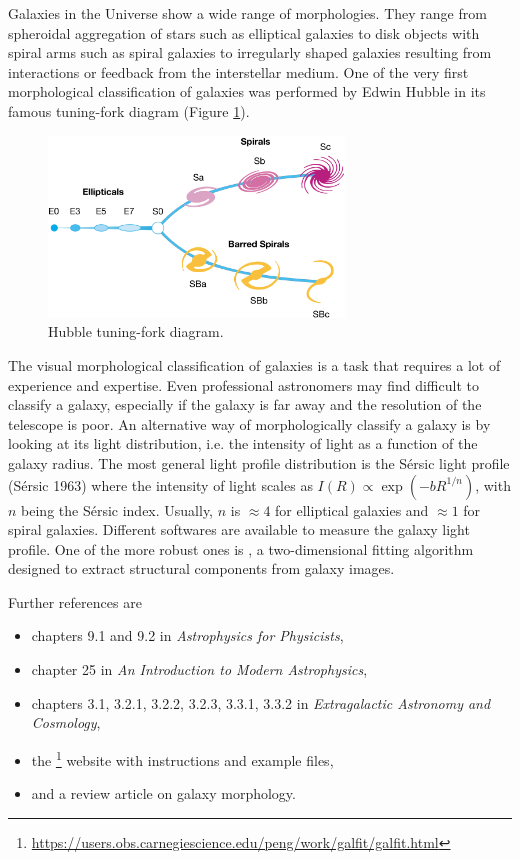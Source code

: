 \documentclass[a4paper, 11pt, fleqn]{memoir}
\begin{document}
Galaxies in the Universe show a wide range of morphologies.
They range from spheroidal aggregation of stars such as elliptical galaxies to disk objects with spiral arms such as spiral galaxies to irregularly shaped galaxies resulting from interactions or feedback from the interstellar medium.
One of the very first morphological classification of galaxies was performed by Edwin Hubble in its famous tuning-fork diagram (Figure \ref{fig:tuningfork}).

\begin{figure}
    \centering
    \includegraphics[width=0.7\textwidth]{tuningfork}
    \caption{Hubble tuning-fork diagram.}
    \label{fig:tuningfork}
\end{figure}

The visual morphological classification of galaxies is a task that requires a lot of experience and expertise.
Even professional astronomers may find difficult to classify a galaxy, especially if the galaxy is far away and the resolution of the telescope is poor.
An alternative way of morphologically classify a galaxy is by looking at its light distribution, i.e. the intensity of light as a function of the galaxy radius.
The most general light profile distribution is the Sérsic light profile (Sérsic 1963) where the intensity of light scales as $I(R) \propto \exp(-b R^{1/n})$, with $n$ being the Sérsic index.
Usually, $n$ is $\approx 4$ for elliptical galaxies and $\approx 1$ for spiral galaxies.
Different softwares are available to measure the galaxy light profile.
One of the more robust ones is \autocite{Peng2010Galfit}, a two-dimensional fitting algorithm designed to extract
structural components from galaxy images.

Further references are
\begin{itemize}
    \item chapters 9.1 and 9.2 in \emph{Astrophysics for Physicists}\autocite{Choudhuri},
    \item chapter 25 in \emph{An Introduction to Modern Astrophysics}\autocite{carroll2017introduction},
    \item chapters 3.1, 3.2.1, 3.2.2, 3.2.3, 3.3.1, 3.3.2 in \emph{Extragalactic Astronomy and Cosmology}\autocite{Schneider2006ExtragalacticAstronomy},
    \item the \footnote{\url{https://users.obs.carnegiescience.edu/peng/work/galfit/galfit.html}} website with instructions and example files,
    \item and a review article on galaxy morphology\autocite{Buta2013GalaxyMorphology}.
\end{itemize}
\end{document}
